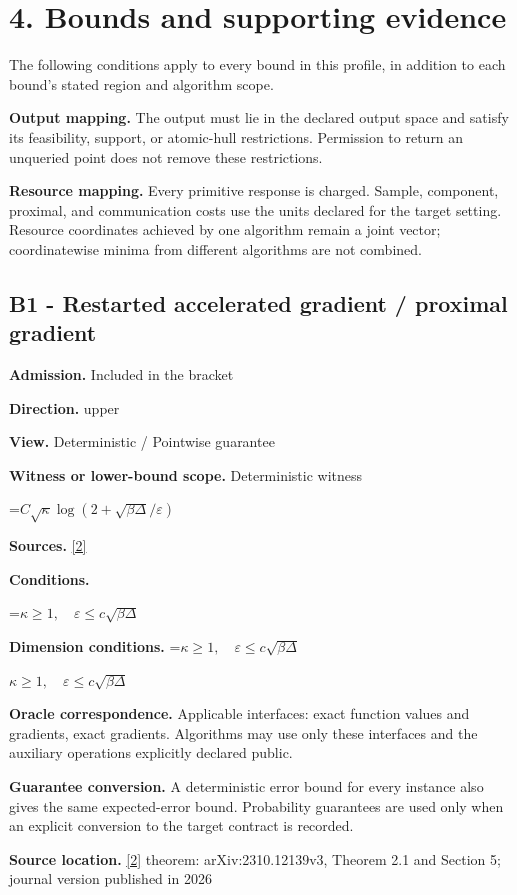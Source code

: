 \documentclass[10pt,a4paper]{article}
\newcommand{\AtlasMath}[1]{\par\begingroup\centering\setbox0=\hbox{$\displaystyle #1$}\ifdim\wd0>1.4\linewidth\typeout{ATLAS WIDE FORMULA: \the\wd0}\fi\ifdim\wd0>\linewidth\resizebox{\linewidth}{!}{\box0}\else\box0\fi\par\endgroup}
\newcommand{\AtlasInlineMath}[1]{\begingroup\setbox0=\hbox{$#1$}\ifdim\wd0>.4\linewidth\endgroup\AtlasMath{#1}\else\endgroup$#1$\fi}
\begin{document}
\section{4. Bounds and supporting evidence}
The following conditions apply to every bound in this profile, in addition to each bound's stated region and algorithm scope.

\textbf{Output mapping.} The output must lie in the declared output space and satisfy its feasibility, support, or atomic-hull restrictions. Permission to return an unqueried point does not remove these restrictions.

\textbf{Resource mapping.} Every primitive response is charged. Sample, component, proximal, and communication costs use the units declared for the target setting. Resource coordinates achieved by one algorithm remain a joint vector; coordinatewise minima from different algorithms are not combined.

\subsection{B1 - Restarted accelerated gradient / proximal gradient}
\textbf{Admission.} Included in the bracket

\textbf{Direction.} upper

\textbf{View.} Deterministic / Pointwise guarantee

\textbf{Witness or lower-bound scope.} Deterministic witness

\AtlasMath{C\sqrt\kappa\log(2+\sqrt{\beta\Delta}/\varepsilon)}
\textbf{Sources.} \href{https://doi.org/10.1007/s10107-026-02352-2}{[2]}

\textbf{Conditions.} 
\AtlasMath{\kappa\ge1,\quad\varepsilon\le c\sqrt{\beta\Delta}}


\textbf{Dimension conditions.} \AtlasInlineMath{\kappa\ge1,\quad\varepsilon\le c\sqrt{\beta\Delta}}

\textbf{Oracle correspondence.} Applicable interfaces: exact function values and gradients, exact gradients. Algorithms may use only these interfaces and the auxiliary operations explicitly declared public.

\textbf{Guarantee conversion.} A deterministic error bound for every instance also gives the same expected-error bound. Probability guarantees are used only when an explicit conversion to the target contract is recorded.

\textbf{Source location.} \href{https://doi.org/10.1007/s10107-026-02352-2}{[2]} theorem: arXiv:2310.12139v3, Theorem 2.1 and Section 5; journal version published in 2026
\end{document}
